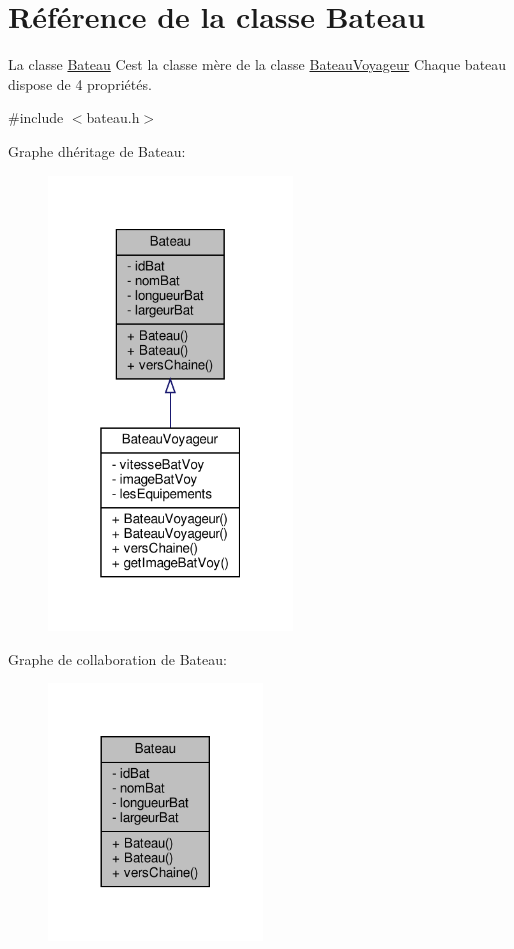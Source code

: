 \hypertarget{class_bateau}{}\section{Référence de la classe Bateau}
\label{class_bateau}


La classe \hyperlink{class_bateau}{Bateau} C\textquotesingle{}est la classe mère de la classe \hyperlink{class_bateau_voyageur}{Bateau\+Voyageur} Chaque bateau dispose de 4 propriétés.  




{\ttfamily \#include $<$bateau.\+h$>$}



Graphe d\textquotesingle{}héritage de Bateau\+:\nopagebreak
\begin{figure}[H]
\begin{center}
\leavevmode
\includegraphics[width=184pt]{class_bateau__inherit__graph}
\end{center}
\end{figure}


Graphe de collaboration de Bateau\+:\nopagebreak
\begin{figure}[H]
\begin{center}
\leavevmode
\includegraphics[width=161pt]{class_bateau__coll__graph}
\end{center}
\end{figure}
